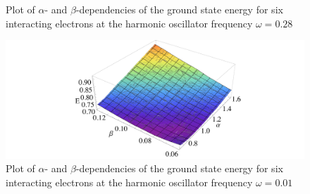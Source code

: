 \begin{appendix}
\begin{figure}
    \caption{Plot of $\alpha$- and $\beta$-dependencies of the ground state energy for six interacting electrons at the harmonic oscillator frequency $\omega=0.28$}
    \label{fig:psix028}
\end{figure}
\begin{figure}
    \centering
    \includegraphics[scale=0.5]{psix001}
    \caption{Plot of $\alpha$- and $\beta$-dependencies of the ground state energy for six interacting electrons at the harmonic oscillator frequency $\omega=0.01$}
    \label{fig:psix001}
\end{figure}
\end{appendix}